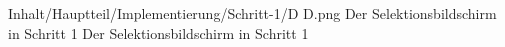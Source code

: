 \begin{alexfigure}{Inhalt/Hauptteil/Implementierung/Schritt-1/D D.png}
  {Der Selektionsbildschirm in Schritt 1}
  {Der Selektionsbildschirm in Schritt 1}

  \label{fig:Schritt1SelektionsBildschirmStatus}

\end{alexfigure}


